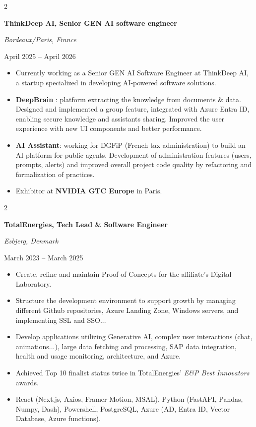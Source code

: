 \documentclass[10pt, letterpaper]{article}
\newenvironment{highlights}{
    \begin{itemize}[
        topsep=0.10 cm,
        parsep=0.10 cm,
        partopsep=0pt,
        itemsep=0pt,
        leftmargin=0.4 cm + 10pt
    ]
}{
    \end{itemize}
} %
\newenvironment{twocolentry}[2][]{
    \onecolentry
    \def\secondColumn{#2}
    \setcolumnwidth{\fill, 6 cm}
    \begin{paracol}{2}
}{
    \switchcolumn \raggedleft \secondColumn
    \end{paracol}
    \endonecolentry
} %
\begin{document}
        \vspace{0.2 cm}

        \begin{twocolentry}{\color{secondaryColor}April 2025 – April 2026}
            \textbf{ThinkDeep AI, Senior GEN AI software engineer}

            \textit{Bordeaux/Paris, France}
        \end{twocolentry}
        
        \begin{highlights}
                \item Currently working as a Senior GEN AI Software Engineer at ThinkDeep AI, a startup specialized in developing AI-powered software solutions.

                \item \textbf{DeepBrain} : platform extracting the knowledge from documents \& data. Designed and implemented a group feature, integrated with Azure Entra ID, enabling secure knowledge and assistants sharing. Improved the user experience with new UI components and better performance.

                \item \textbf{AI Assistant}: working for DGFiP (French tax administration) to build an AI platform for public agents. Development of administration features (users, prompts, alerts) and improved overall project code quality by refactoring and formalization of practices.

                \item Exhibitor at \textbf{NVIDIA GTC Europe} in Paris.
        \end{highlights}

        \vspace{0.2 cm}
        
        \begin{twocolentry}{\color{secondaryColor}March 2023 – March 2025}
            \textbf{TotalEnergies, Tech Lead \& Software Engineer}

            \textit{Esbjerg, Denmark}
        \end{twocolentry}
        \begin{highlights}
            \item Create, refine and maintain Proof of Concepts for the affiliate's Digital Laboratory.
            \item Structure the development environment to support growth by managing different Github repositories, Azure Landing Zone, Windows servers, and implementing SSL and SSO...
            \item Develop applications utilizing Generative AI, complex user interactions (chat, animations...), large data fetching and processing, SAP data integration, health and usage monitoring, architecture, and Azure.
            \item Achieved Top 10 finalist status twice in TotalEnergies' \textit{E\&P Best Innovators} awards.
            \item React (Next.js, Axios, Framer-Motion, MSAL), Python (FastAPI, Pandas, Numpy, Dash), Powershell, PostgreSQL, Azure (AD, Entra ID, Vector Database, Azure functions).
        \end{highlights}
\end{document}
